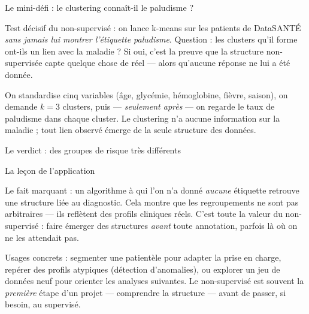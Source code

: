 \documentclass[aspectratio=169,11pt]{beamer}
\begin{document}
\begin{frame}{Le mini-défi : le clustering connaît-il le paludisme ?}
\begin{ucadfront}
{\small Test décisif du non-supervisé : on lance k-means sur les patients de DataSANTÉ \emph{sans jamais lui montrer l'étiquette paludisme}. Question : les clusters qu'il forme ont-ils un lien avec la maladie ? Si oui, c'est la preuve que la structure non-supervisée capte quelque chose de réel — alors qu'aucune réponse ne lui a été donnée.}
\end{ucadfront}
{\small On standardise cinq variables (âge, glycémie, hémoglobine, fièvre, saison), on demande $k = 3$ clusters, puis — \emph{seulement après} — on regarde le taux de paludisme dans chaque cluster. Le clustering n'a aucune information sur la maladie ; tout lien observé émerge de la seule structure des données.}
\end{frame}

\begin{frame}{Le verdict : des groupes de risque très différents}
\end{frame}

\begin{frame}{La leçon de l'application}
\begin{ucadret}
{\small Le fait marquant : un algorithme à qui l'on n'a donné \emph{aucune} étiquette retrouve une structure liée au diagnostic. Cela montre que les regroupements ne sont pas arbitraires — ils reflètent des profils cliniques réels. C'est toute la valeur du non-supervisé : faire émerger des structures \emph{avant} toute annotation, parfois là où on ne les attendait pas.}
\end{ucadret}
{\small Usages concrets : segmenter une patientèle pour adapter la prise en charge, repérer des profils atypiques (détection d'anomalies), ou explorer un jeu de données neuf pour orienter les analyses suivantes. Le non-supervisé est souvent la \emph{première} étape d'un projet — comprendre la structure — avant de passer, si besoin, au supervisé.}
\end{frame}

\end{document}
